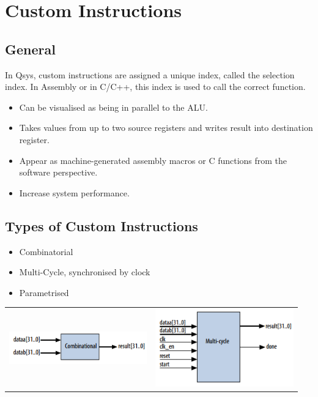 \section{Custom Instructions }
	
	\subsection{General}
		In Qsys, custom instructions are assigned a unique index, called the selection index. In Assembly or in C/C++, this index is used to call the correct function.
		  
		\begin{itemize}
		  \item Can be visualised as being in parallel to the ALU.
		  \item Takes values from up to two source registers and writes result into destination register.
		  \item Appear as machine-generated assembly macros or C functions from the software perspective.
		  \item Increase system performance.
		\end{itemize}
		
	\subsection{Types of Custom Instructions}
	
		\begin{itemize}
		  \item Combinatorial
		  \item Multi-Cycle, synchronised by clock
		  \item Parametrised
		\end{itemize}
		
		\begin{table}[H]\centering
			\begin{tabular}{p{0.475\linewidth}p{0.475\linewidth}}
				\includegraphics[scale=1]{./pictures/customInstCombinational.png}
					& \includegraphics[scale=1]{./pictures/customInstMultiCycle.png}\\
			\end{tabular}
		\end{table}
		
